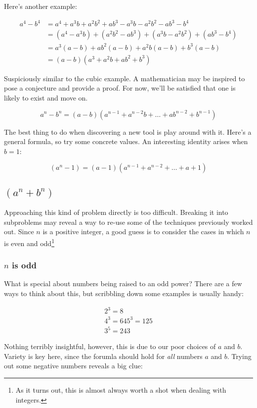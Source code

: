 \documentclass{standalone}
\begin{document}
Here's another example:

\begin{align*}
  a^4 - b^4
  &= a^4 + a^3b + a^2b^2 + ab^3 -a^3b - a^2b^2 - ab^3 - b^4 \\
  &= (a^4 - a^3b) + (a^2b^2 - ab^3) + (a^3b - a^2b^2) + (ab^3 - b^4) \\
  &= a^3(a - b) + ab^2(a - b) + a^2b(a - b) + b^3(a - b) \\
  &= (a - b)(a^3 + a^2b + ab^2 + b^3)
\end{align*}

Suspiciously similar to the cubic example. A mathematician may be inspired to
pose a conjecture and provide a proof. For now, we'll be satisfied that one is
likely to exist and move on.

\[
  a^n - b^n = (a - b)(a^{n-1} + a^{n-2}b + \dots + ab^{n-2} + b^{n-1})
\]

The best thing to do when discovering a new tool is play around with it. Here's
a general formula, so try some concrete values. An interesting identity arises
when $b = 1$:

\[
  (a^n - 1) = (a - 1)(a^{n-1} + a^{n-2} + \dots + a + 1)
\]

\subsection{\( (a^n + b^n) \)}

Approaching this kind of problem directly is too difficult. Breaking it into
subproblems may reveal a way to re-use some of the techniques previously worked
out. Since $n$ is a positive integer, a good guess is to consider the cases in
which $n$ is even and odd\footnote{As it turns out, this is almost always worth
a shot when dealing with integers.}

\subsubsection{\(n\) is odd}

What is special about numbers being raised to an odd power? There are a few
ways to think about this, but scribbling down some examples is usually handy:

\begin{gather*}
  2^3 = 8 \\
  4^3 = 64
  5^3 = 125 \\
  3^5 = 243
\end{gather*}

Nothing terribly insightful, however, this is due to our poor choices of $a$ and
$b$. Variety is key here, since the forumla should hold for \emph{all} numbers
$a$ and $b$. Trying out some negative numbers reveals a big clue:
\end{document}
